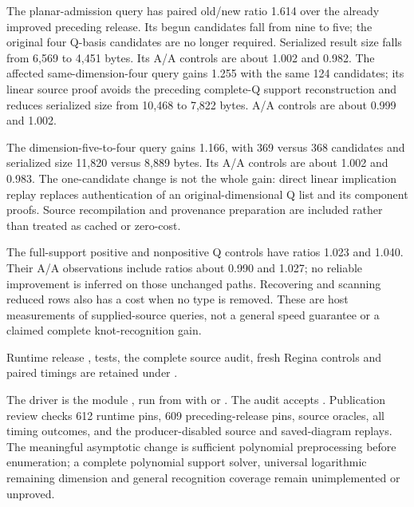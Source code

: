 The planar-admission query has paired old/new ratio 1.614 over the already
improved preceding release. Its begun candidates fall from nine to five;
the original four Q-basis candidates are no longer required. Serialized
result size falls from 6,569 to 4,451 bytes. Its A/A controls are about 1.002
and 0.982. The affected same-dimension-four query gains 1.255 with the same
124 candidates; its linear source proof avoids the preceding complete-Q
support reconstruction and reduces serialized size from 10,468 to 7,822
bytes. A/A controls are about 0.999 and 1.002.

The dimension-five-to-four query gains 1.166, with 369 versus 368 candidates
and serialized size 11,820 versus 8,889 bytes. Its A/A controls are about
1.002 and 0.983. The one-candidate change is not the whole gain: direct
linear implication replay replaces authentication of an original-dimensional
Q list and its component proofs. Source recompilation and provenance
preparation are included rather than treated as cached or zero-cost.

The full-support positive and nonpositive Q controls have ratios 1.023 and
1.040. Their A/A observations include ratios about 0.990 and 1.027; no
reliable improvement is inferred on those unchanged paths. Recovering and
scanning reduced rows also has a cost when no type is removed. These are
host measurements of supplied-source queries, not a general speed guarantee
or a claimed complete knot-recognition gain.

Runtime release , tests, the complete source audit,
fresh Regina controls and paired timings are retained under
.

The driver is the module
\allowbreak{},
run from  with  or .
The audit accepts .
Publication review checks 612 runtime pins, 609 preceding-release pins,
source oracles, all timing outcomes, and the producer-disabled source and
saved-diagram replays. The meaningful asymptotic change is sufficient
polynomial preprocessing before enumeration; a complete polynomial support
solver, universal logarithmic remaining dimension and general recognition
coverage remain unimplemented or unproved.
